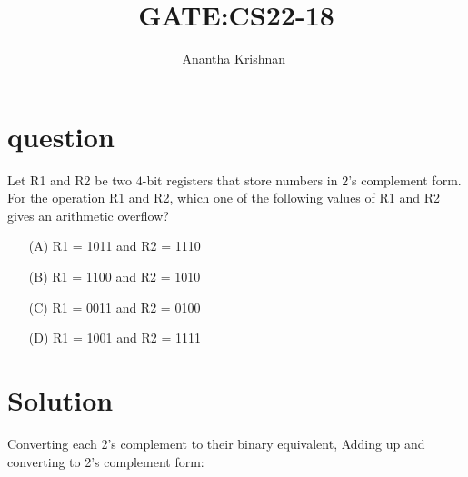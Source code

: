 \documentclass[journal,12pt,onecolumn]{IEEEtran}
\theoremstyle{remark}
\begin{document}

\vspace{3cm}

\title{GATE:CS22-18}
\author{Anantha Krishnan $^{}$%
}
\maketitle
\bigskip



\section{question}
Let R1 and R2 be two $4$-bit registers that store numbers in $2$'s complement form. For the operation R1 and R2, which one of the following values of R1 and R2 gives an arithmetic overflow?
\begin{enumerate}
    \item [(A)] R1 = 1011 and R2 = 1110
        \item [(B)] R1 = 1100 and R2 = 1010
    \item [(C)] R1 = 0011 and R2 = 0100
    \item [(D)] R1 = 1001 and R2 = 1111
\end{enumerate}
\section{Solution}
Converting each 2's complement to their binary equivalent, Adding up and converting to 2's complement form:
\end{document}
